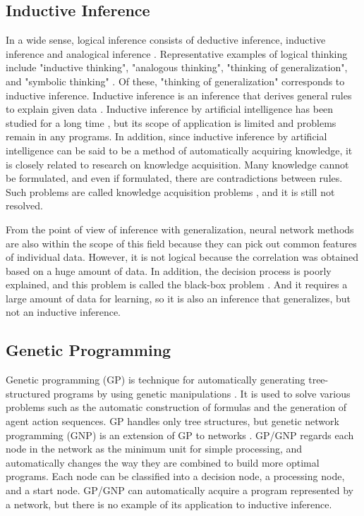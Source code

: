 \documentclass{article}
\begin{document}
\subsection {Inductive Inference}
In a wide sense, logical inference consists of deductive inference, inductive inference and analogical inference \cite{math300}.
Representative examples of logical thinking include "inductive thinking", "analogous thinking", "thinking of generalization", and "symbolic thinking" \cite{saito:11}.
Of these, "thinking of generalization" corresponds to inductive inference.
Inductive inference is an inference that derives general rules to explain given data \cite {inductive-reasoning}.
Inductive inference by artificial intelligence has been studied for a long time \cite{CASE1983193}\cite{4767034}, but its scope of application is limited and problems remain in any programs.
In addition, since inductive inference by artificial intelligence can be said to be a method of automatically acquiring knowledge, it is closely related to research on knowledge acquisition.
Many knowledge cannot be formulated, and even if formulated, there are contradictions between rules. Such problems are called knowledge acquisition problems \cite{KnowledgeAI}\cite{KAIssues}, and it is still not resolved.

From the point of view of inference with generalization, neural network methods are also within the scope of this field because they can pick out common features of individual data.
However, it is not logical because the correlation was obtained based on a huge amount of data.
In addition, the decision process is poorly explained, and this problem is called the black-box problem \cite{BlackBoxProblem}.
And it requires a large amount of data for learning, so it is also an inference that generalizes, but not an inductive inference.

\subsection {Genetic Programming}
Genetic programming (GP) is technique for automatically generating tree-structured programs by using genetic manipulations \cite{Koza1994}.
It is used to solve various problems such as the automatic construction of formulas and the generation of agent action sequences.
GP handles only tree structures, but genetic network programming (GNP) is an extension of GP to networks \cite{gnp}.
GP/GNP regards each node in the network as the minimum unit for simple processing, and automatically changes the way they are combined to build more optimal programs.
Each node can be classified into a decision node, a processing node, and a start node.
GP/GNP can automatically acquire a program represented by a network, but there is no example of its application to inductive inference.
\end{document}

